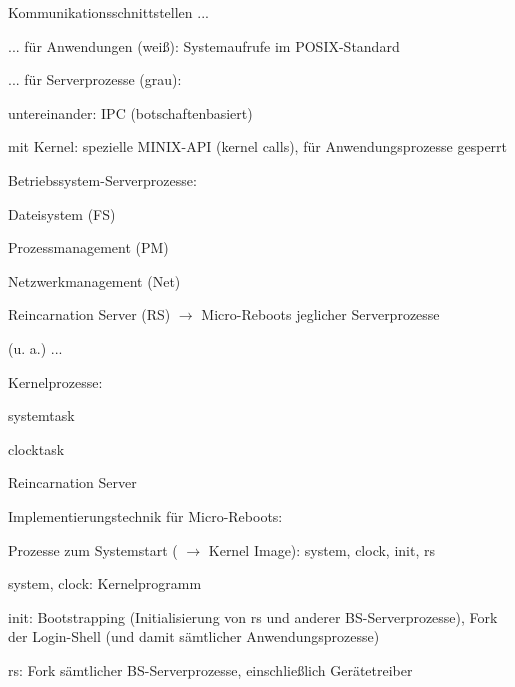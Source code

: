 \documentclass[a4paper]{article}
\begin{document}
\begin{multicols}{3}
    \begin{itemize*}
        \item
        Kommunikationsschnittstellen ...
        \begin{itemize*}
            \item ... für Anwendungen (weiß): Systemaufrufe im POSIX-Standard
            \item ... für Serverprozesse (grau): \begin{itemize*} \item untereinander: IPC (botschaftenbasiert) \item mit Kernel: spezielle MINIX-API (kernel calls), für Anwendungsprozesse gesperrt \end{itemize*}
        \end{itemize*}
        \item
        Betriebssystem-Serverprozesse:
        \item
        Dateisystem (FS)
        \item
        Prozessmanagement (PM)
        \item
        Netzwerkmanagement (Net)
        \item
        Reincarnation Server (RS) $\rightarrow$ Micro-Reboots
        jeglicher Serverprozesse
        \item
        (u. a.) ...
        \item
        Kernelprozesse:
        \item
        systemtask
        \item
        clocktask
    \end{itemize*}

    Reincarnation Server

    \begin{itemize*}
        \item
        Implementierungstechnik für Micro-Reboots:
        \item
        Prozesse zum Systemstart ( $\rightarrow$ Kernel
        Image): system, clock, init, rs
        \begin{itemize*}
            \item system, clock: Kernelprogramm
            \item init: Bootstrapping (Initialisierung von rs und anderer BS-Serverprozesse), Fork der Login-Shell (und damit sämtlicher Anwendungsprozesse)
            \item rs: Fork sämtlicher BS-Serverprozesse, einschließlich Gerätetreiber
        \end{itemize*}
    \end{itemize*}


\end{multicols}
\end{document}
